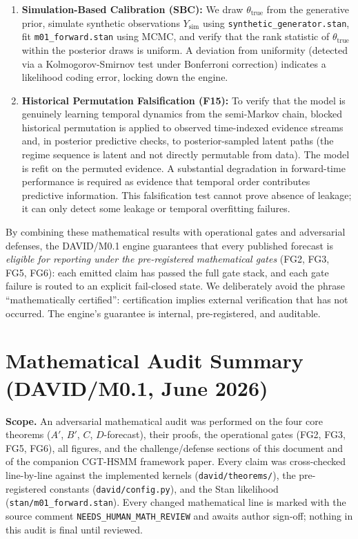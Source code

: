 \documentclass[11pt,a4paper]{article}
\begin{document}
\begin{enumerate}
    \item \textbf{Simulation-Based Calibration (SBC):} We draw $\theta_{\text{true}}$ from the generative prior, simulate synthetic observations $Y_{\text{sim}}$ using \texttt{synthetic\_generator.stan}, fit \texttt{m01\_forward.stan} using MCMC, and verify that the rank statistic of $\theta_{\text{true}}$ within the posterior draws is uniform. A deviation from uniformity (detected via a Kolmogorov-Smirnov test under Bonferroni correction) indicates a likelihood coding error, locking down the engine.
    \item \textbf{Historical Permutation Falsification (F15):} To verify that the model is genuinely learning temporal dynamics from the semi-Markov chain, blocked historical permutation is applied to observed time-indexed evidence streams and, in posterior predictive checks, to posterior-sampled latent paths (the regime sequence is latent and not directly permutable from data). The model is refit on the permuted evidence. A substantial degradation in forward-time performance is required as evidence that temporal order contributes predictive information. This falsification test cannot prove absence of leakage; it can only detect some leakage or temporal overfitting failures.
\end{enumerate}

By combining these mathematical results with operational gates and adversarial defenses, the DAVID/M0.1 engine guarantees that every published forecast is \emph{eligible for reporting under the pre-registered mathematical gates} (FG2, FG3, FG5, FG6): each emitted claim has passed the full gate stack, and each gate failure is routed to an explicit fail-closed state. We deliberately avoid the phrase ``mathematically certified'': certification implies external verification that has not occurred. The engine's guarantee is internal, pre-registered, and auditable. %

\appendix
\section{Mathematical Audit Summary (DAVID/M0.1, June 2026)}

\begin{sloppypar}
\textbf{Scope.} An adversarial mathematical audit was performed on the four core theorems ($A'$, $B'$, $C$, $D$-forecast), their proofs, the operational gates (FG2, FG3, FG5, FG6), all figures, and the challenge/defense sections of this document and of the companion CGT-HSMM framework paper. Every claim was cross-checked line-by-line against the implemented kernels (\texttt{david/theorems/}), the pre-registered constants (\texttt{david/config.py}), and the Stan likelihood (\texttt{stan/m01\_forward.stan}). Every changed mathematical line is marked with the source comment \texttt{NEEDS\_HUMAN\_}\allowbreak\texttt{MATH\_REVIEW} and awaits author sign-off; nothing in this audit is final until reviewed.
\end{sloppypar}
\end{document}
